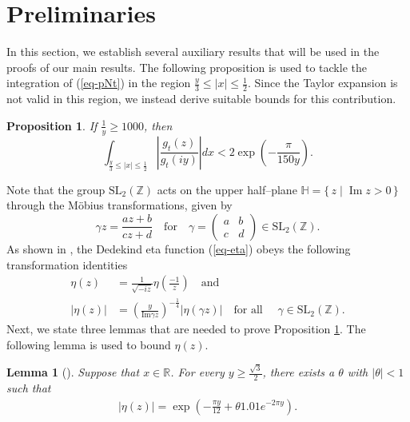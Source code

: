 \documentclass[11pt]{amsart}
\theoremstyle{plain}
\newtheorem{lemma}[theorem]{Lemma}
\newtheorem{proposition}[theorem]{Proposition}
\renewcommand{\Im}{\operatorname{Im}}
\numberwithin{equation}{section}
\begin{document}
	\section{Preliminaries}\label{sec-preli}
	In this section, we establish several auxiliary results that will be used in the proofs of our main results. The following proposition is used to tackle the integration of (\ref{eq-pNt}) in the region $\frac{y}{3}\le|x|\le\frac{1}{2}$. Since the Taylor expansion is not valid in this region, we instead derive suitable bounds for this contribution.
	\begin{proposition}\label{proposition-error}
		If $\frac{1}{y}\ge 1000$, then
		\begin{equation*}
			\int_{\frac{y}{3}\le |x|\le \frac{1}{2}}  \left|\frac{g_{t}(z)}{g_t(iy)}\right| dx<2\exp\left(-\frac{\pi}{150y}\right).
		\end{equation*}   
	\end{proposition}
	Note that the group $\text{SL}_{2}(\mathbb{Z})$ acts on the upper half–plane 
	$\mathbb{H}=\{\,z \mid \Im z>0\,\}$ through the Möbius 
	transformations, given by
	\begin{equation*}
		\gamma z=\frac{az+b}{cz+d} \quad \text{for}\quad \gamma= \begin{pmatrix}
			a & b\\
			c & d
		\end{pmatrix}\in \text{SL}_2(\mathbb{Z}).   
	\end{equation*}
	As shown in \cite{tyler2024asymptotics}, the Dedekind eta function (\ref{eq-eta}) obeys the following transformation identities
	\begin{equation}\label{eq-eta modular}
		\begin{aligned}
			\eta(z)&=\frac{1}{\sqrt{-iz}}\eta\left(\frac{-1}{z}\right)   \quad \text{and}\\
			|\eta(z)|&=\left(\frac{y}{\text{Im}\gamma z}\right)^{-\frac{1}{4}}|\eta(\gamma z)| \quad \text{for all }\quad \gamma\in \text{SL}_{2}(\mathbb{Z}).
		\end{aligned}
	\end{equation}
	Next, we state three lemmas that are needed to prove Proposition \ref{proposition-error}.
	The following lemma is used to bound $\eta(z)$.
	\begin{lemma}[{\cite[Lemma 2.2]{tyler2024asymptotics}}]\label{lemma-2.0}
		Suppose that $x\in\mathbb{R}$. For every $y \ge \frac{\sqrt{3}}{2}$, there exists a $\theta$ with $|\theta|<1$ such that
		\begin{align*}
			|\eta(z)|=\exp\left(-\frac{\pi y}{12}+\theta 1.01e^{-2\pi y}\right).
		\end{align*}
	\end{lemma}
\end{document}
